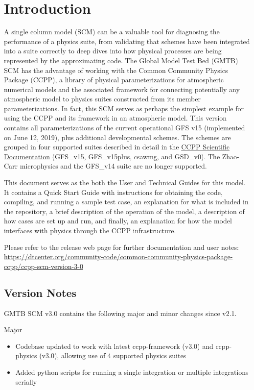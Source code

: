 \chapter{Introduction}
\label{chapter: introduction}

A single column model (SCM) can be a valuable tool for diagnosing the performance of a physics suite, from validating that schemes have been integrated into a suite correctly to deep dives into how physical processes are being represented by the approximating code. The Global Model Test Bed (GMTB) SCM has the advantage of working with the Common Community Physics Package (CCPP), a library of physical parameterizations for atmospheric numerical models and the associated framework for connecting potentially any atmospheric model to physics suites constructed from its member parameterizations. In fact, this SCM serves as perhaps the simplest example for using the CCPP and its framework in an atmospheric model. This version contains all parameterizations of the current operational GFS v15 (implemented on June 12, 2019), plus additional developmental schemes. The schemes are grouped in four supported suites described in detail in the \href{https://dtcenter.org/GMTB/v3.0/sci\_doc/}{CCPP Scientific Documentation} (GFS\_v15, GFS\_v15plus, csawmg, and GSD\_v0). The Zhao-Carr microphysics and the GFS\_v14 suite are no longer supported.

This document serves as the both the User and Technical Guides for this model. It contains a Quick Start Guide with instructions for obtaining the code, compiling, and running a sample test case, an explanation for what is included in the repository, a brief description of the operation of the model, a description of how cases are set up and run, and finally, an explanation for how the model interfaces with physics through the CCPP infrastructure.

Please refer to the release web page for further documentation and user notes:\\ \url{https://dtcenter.org/community-code/common-community-physics-package-ccpp/ccpp-scm-version-3-0}

\section{Version Notes}

GMTB SCM v3.0 contains the following major and minor changes since v2.1.

Major
\begin{itemize}
\item Codebase updated to work with latest ccpp-framework (v3.0) and ccpp-physics (v3.0), allowing use of 4 supported physics suites
\item Added python scripts for running a single integration or multiple integrations serially
\end{itemize}

